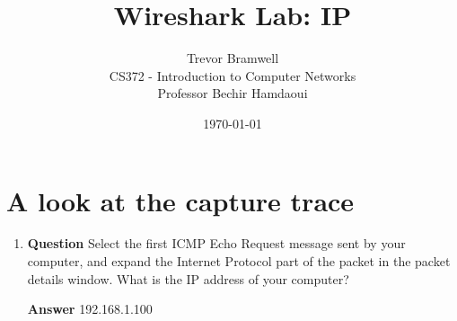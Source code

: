 \documentclass[12pt,letterpaper]{article}
\title{Wireshark Lab: IP}
\author{
    Trevor Bramwell \\
    CS372 - Introduction to Computer Networks \\
    Professor Bechir Hamdaoui
}
\date{\today}
\newcommand{\q}{\textbf{Question} }
\newcommand{\ans}{\textbf{Answer} }
\begin{document}
\maketitle

\setcounter{section}{1}
\section{A look at the capture trace}
\begin{enumerate}
\item \q Select the first ICMP Echo Request message sent by your
computer, and expand the Internet Protocol part of the packet in the packet
details window. What is the IP address of your computer?

\ans 192.168.1.100
\end{enumerate}


\pagebreak
\end{document}
